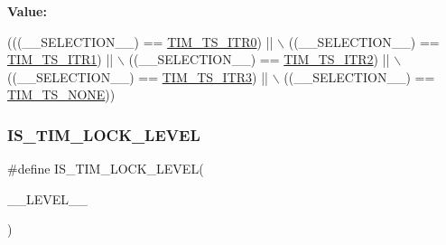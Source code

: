 {\bfseries Value\+:}
\begin{DoxyCode}
(((\_\_SELECTION\_\_) == \hyperlink{group___t_i_m___trigger___selection_gab7cf2b7db3956d4fd1e5a5d84f4891e7}{TIM\_TS\_ITR0}) || \(\backslash\)
                                                               ((\_\_SELECTION\_\_) == 
      \hyperlink{group___t_i_m___trigger___selection_gad90fbca297153ca9c0112a67ea2c6cb3}{TIM\_TS\_ITR1}) || \(\backslash\)
                                                               ((\_\_SELECTION\_\_) == 
      \hyperlink{group___t_i_m___trigger___selection_ga8599ba58a5f911d648503c7ac55d4320}{TIM\_TS\_ITR2}) || \(\backslash\)
                                                               ((\_\_SELECTION\_\_) == 
      \hyperlink{group___t_i_m___trigger___selection_ga63183e611b91c5847040172c0069514d}{TIM\_TS\_ITR3}) || \(\backslash\)
                                                               ((\_\_SELECTION\_\_) == 
      \hyperlink{group___t_i_m___trigger___selection_ga257bee9dc9f2f71a73124dd8c2329480}{TIM\_TS\_NONE}))
\end{DoxyCode}
\mbox{\label{group___t_i_m___private___macros_gad53d9e9b4fa060db29f3900b3dfcb3ed}} 
\subsubsection{\texorpdfstring{I\+S\+\_\+\+T\+I\+M\+\_\+\+L\+O\+C\+K\+\_\+\+L\+E\+V\+EL}{IS\_TIM\_LOCK\_LEVEL}}
{\footnotesize\ttfamily \#define I\+S\+\_\+\+T\+I\+M\+\_\+\+L\+O\+C\+K\+\_\+\+L\+E\+V\+EL(\begin{DoxyParamCaption}\item[{}]{\+\_\+\+\_\+\+L\+E\+V\+E\+L\+\_\+\+\_\+ }\end{DoxyParamCaption})}

